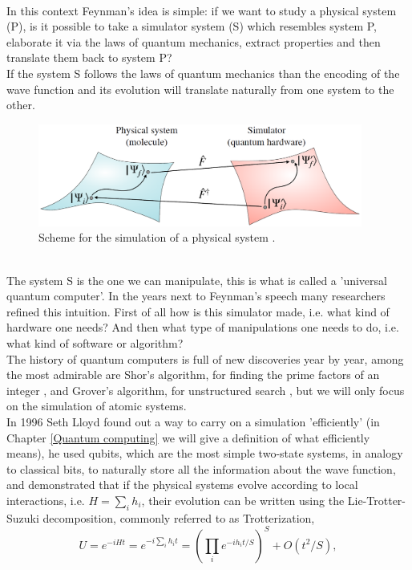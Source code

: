 \\
In this context Feynman's idea is simple: if we want to study a physical system (P), is it possible to take a simulator system (S) which resembles system P, elaborate it via the laws of quantum mechanics, extract properties and then translate them back to system P? \\
If the system S follows the laws of quantum mechanics than the encoding of the wave function and its evolution will translate naturally from one system to the other.
\begin{figure}[ht]
\centering
\includegraphics[width=0.95\textwidth]{figures/Simulation.png}
\caption{Scheme for the simulation of a physical system \cite{Motta2021Dec}.}
\end{figure} \\
The system S is the one we can manipulate, this is what is called a 'universal quantum computer'. In the years next to Feynman's speech many researchers refined this intuition. First of all how is this simulator made, i.e. what kind of hardware one needs? And then what type of manipulations one needs to do, i.e. what kind of software or algorithm? \\
The history of quantum computers is full of new discoveries year by year, among the most admirable are Shor's algorithm, for finding the prime factors of an integer \cite{Shor1994Nov}, and Grover's algorithm, for unstructured search \cite{Grover1996Jul}, but we will only focus on the simulation of atomic systems. \\
In 1996 Seth Lloyd \cite{Lloyd1996Aug} found out a way to carry on a simulation 'efficiently' (in Chapter \ref{Quantum computing} we will give a definition of what efficiently means), he used qubits, which are the most simple two-state systems, in analogy to classical bits, to naturally store all the information about the wave function, and demonstrated that if the physical systems evolve according to local interactions, i.e. $H = \sum_i h_i$, their evolution can be written using the Lie-Trotter-Suzuki decomposition, commonly referred to as Trotterization,
\begin{equation}
    U = e^{-iHt} = e^{-i\sum_i h_i t} = \left( \prod_i e^{-i h_i t/S} \right)^S + O(t^2 / S),
\end{equation}
